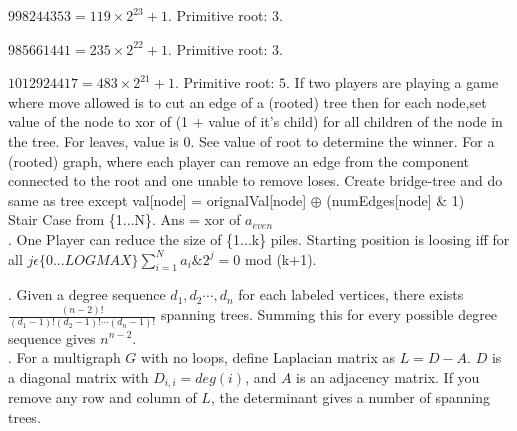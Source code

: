 $998244353 = 119 \times 2^{23} + 1$. Primitive root: $3$.

$985661441 = 235 \times 2^{22} + 1$. Primitive root: $3$.

$1012924417 = 483 \times 2^{21} + 1$. Primitive root: $5$.
 If two players are playing a game where move allowed is to cut an edge of a (rooted) tree then for each node,set value of the node to xor of (1 + value of it's child) for all children of the node in the tree. For leaves, value is 0. See value of root to determine the winner. For a (rooted) graph, where each player can remove an edge from the component connected to the root and one unable to remove loses. Create bridge-tree and do same as tree except val[node] = orignalVal[node] $\oplus$ (numEdges[node] \& 1) \\
 Stair Case from \{1...N\}. Ans = xor of $a_{even}$ \\
. One Player can reduce the size of \{1...k\} piles. Starting position is loosing iff for all $j \epsilon \{0...LOGMAX\} \sum_{i=1}^{N} a_{i}\&2^{j} = 0$ mod (k+1).
\vspace{-3mm}
\\

 
 
 
\vspace{-7mm}
\vspace{-3mm}

. Given a degree sequence $d_1, d_2 \cdots, d_n$ for each labeled vertices, there exists $\frac{(n-2)!}{(d_1 - 1)!(d_2 - 1)! \cdots (d_n - 1)!}$ spanning trees. Summing this for every possible degree sequence gives $n^{n-2}$. \\

. For a multigraph $G$ with no loops, define Laplacian matrix as $L = D - A$. $D$ is a diagonal matrix with $D_{i, i} = deg(i)$, and $A$ is an adjacency matrix. If you remove any row and column of $L$, the determinant gives a number of spanning trees.\\

